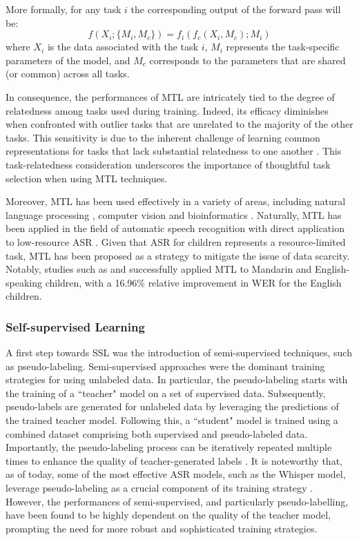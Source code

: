 More formally, for any task $i$ the corresponding output of the forward pass will be:
\begin{equation} \label{equation:MT}
    f(X_i;\{M_i, M_{c}\}) = f_i(f_{c}(X_i,{M_{c}}); {M_i}) 
\end{equation}
where $X_i$ is the data associated with the task $i$, $M_i$ represents the task-specific parameters of the model, and $M_{c}$ corresponds to the parameters that are shared (or common) across all tasks.

In consequence, the performances of \ac{MTL} are intricately tied to the degree of relatedness among tasks used during training. Indeed, its efficacy diminishes when confronted with outlier tasks that are unrelated to the majority of the other tasks. This sensitivity is due to the inherent challenge of learning common representations for tasks that lack substantial relatedness to one another \cite{zhang2018overview}. This task-relatedness consideration underscores the importance of thoughtful task selection when using \ac{MTL} techniques.

Moreover, \ac{MTL} has been used effectively in a variety of areas, including natural language processing \cite{multi-nlp}, computer vision \cite{mtl_computervision} and bioinformatics \cite{bioinfo}. Naturally, \ac{MTL} has been applied in the field of automatic speech recognition \cite{MTL-LFMMI} with direct application to low-resource \ac{ASR} \cite{abad2020}. Given that \ac{ASR} for children represents a resource-limited task, \ac{MTL} has been proposed as a strategy to mitigate the issue of data scarcity. Notably, studies such as \cite{TransferLF} and \cite{2019multi} successfully applied \ac{MTL} to Mandarin and English-speaking children, with a 16.96\% relative improvement in \ac{WER} for the English children.

\subsubsection{Self-supervised Learning}
A first step towards \ac{SSL} was the introduction of semi-supervised techniques, such as pseudo-labeling. Semi-supervised approaches were the dominant training strategies for using unlabeled data. In particular, the pseudo-labeling starts with the training of a ``teacher" model on a set of supervised data. Subsequently, pseudo-labels are generated for unlabeled data by leveraging the predictions of the trained teacher model. Following this, a ``student" model is trained using a combined dataset comprising both supervised and pseudo-labeled data. Importantly, the pseudo-labeling process can be iteratively repeated multiple times to enhance the quality of teacher-generated labels \cite{zavaliagkos1998utilizing,ma2006unsupervised}. It is noteworthy that, as of today, some of the most effective \ac{ASR} models, such as the Whisper model, leverage pseudo-labeling as a crucial component of its training strategy \cite{radford2023robust}. However, the performances of semi-supervised, and particularly pseudo-labelling, have been found to be highly dependent on the quality of the teacher model, prompting the need for more robust and sophisticated training strategies.

